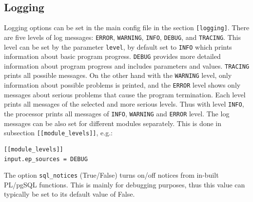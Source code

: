 \documentclass[a4paper,11pt]{article}
\begin{document}
\subsection{Logging}\label{logging}
Logging options can be set in the main config file in the section \verb|[logging]|. There are five levels of log messages: \verb|ERROR|, \verb|WARNING|, \verb|INFO|, \verb|DEBUG|, and \verb|TRACING|. This level can be set by the parameter \verb|level|, by default set to \verb|INFO| which prints information about basic program progress. \verb|DEBUG| provides more detailed information about program progress and includes parameters and values. \verb|TRACING| prints all possible messages. On the other hand with the \verb|WARNING| level, only information about possible problems is printed, and the \verb|ERROR| level shows only messages about serious problems that cause the program termination. Each level prints all messages of the selected and more serious levels. Thus with level \verb|INFO|, the processor prints all messages of \verb|INFO|, \verb|WARNING| and \verb|ERROR| level. The log messages can be also set for different modules separately. This is done in subsection \verb|[[module_levels]]|, e.g.:
\begin{verbatim}
[[module_levels]]
input.ep_sources = DEBUG
\end{verbatim}
The option \verb|sql_notices| (True/False) turns on/off notices from in-built PL/pgSQL functions. This is mainly for debugging purposes, thus this value can typically be set to its default value of False. 
\end{document}
